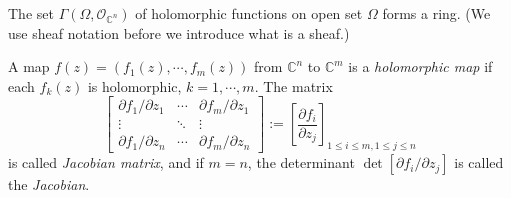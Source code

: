 \begin{cor}
    The set $\Gamma(\Omega,\mathcal{O}_{\mathbb{C}^n})$ of holomorphic functions on open set $\Omega$ forms a ring. (We use sheaf notation before we introduce what is a sheaf.)
\end{cor}

\begin{defn}
    A map $f(z)=(f_1(z),\cdots,f_m(z))$ from $\mathbb{C}^n$ to $\mathbb{C}^m$ is a \emph{holomorphic map} if each $f_k(z)$ is holomorphic, $k=1,\cdots,m$.
    The matrix
    \[\begin{bmatrix}
        \partial{f_1}/\partial{z_1} & \cdots & \partial{f_m}/\partial{z_1}\\
        \vdots & \ddots & \vdots \\
        \partial{f_1}/\partial{z_n} & \cdots & \partial{f_m}/\partial{z_n}
    \end{bmatrix}:=\left[\frac{\partial{f_i}}{\partial{z_j}}\right]_{1\leq i\leq m,1\leq j\leq n}\]
    is called \emph{Jacobian matrix}, and if $m=n$, the determinant $\det[\partial{f_i}/\partial{z_j}]$ is called the \emph{Jacobian}.
\end{defn}

